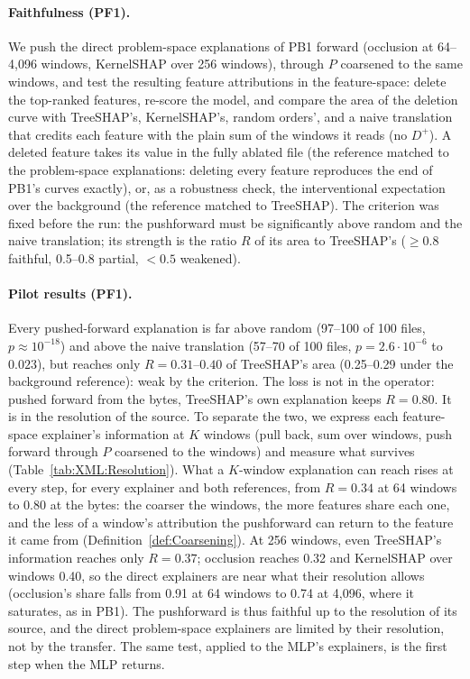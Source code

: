 \paragraph{Faithfulness (PF1).} We push the direct problem-space explanations of PB1 forward (occlusion at 64--4{,}096 windows, KernelSHAP over 256 windows), through $P$ coarsened to the same windows, and test the resulting feature attributions in the feature-space: delete the top-ranked features, re-score the model, and compare the area of the deletion curve with TreeSHAP's, KernelSHAP's, random orders', and a naive translation that credits each feature with the plain sum of the windows it reads (no $D^{+}$). A deleted feature takes its value in the fully ablated file (the reference matched to the problem-space explanations: deleting every feature reproduces the end of PB1's curves exactly), or, as a robustness check, the interventional expectation over the background (the reference matched to TreeSHAP). The criterion was fixed before the run: the pushforward must be significantly above random and the naive translation; its strength is the ratio $R$ of its area to TreeSHAP's ($\geq 0.8$ faithful, 0.5--0.8 partial, $< 0.5$ weakened).

\paragraph{Pilot results (PF1).} Every pushed-forward explanation is far above random (97--100 of 100 files, $p \approx 10^{-18}$) and above the naive translation (57--70 of 100 files, $p = 2.6 \cdot 10^{-6}$ to $0.023$), but reaches only $R = 0.31$--$0.40$ of TreeSHAP's area (0.25--0.29 under the background reference): weak by the criterion. The loss is not in the operator: pushed forward from the bytes, TreeSHAP's own explanation keeps $R = 0.80$. It is in the resolution of the source. To separate the two, we express each feature-space explainer's information at $K$ windows (pull back, sum over windows, push forward through $P$ coarsened to the windows) and measure what survives (Table~\ref{tab:XML:Resolution}). What a $K$-window explanation can reach rises at every step, for every explainer and both references, from $R = 0.34$ at 64 windows to $0.80$ at the bytes: the coarser the windows, the more features share each one, and the less of a window's attribution the pushforward can return to the feature it came from (Definition~\ref{def:Coarsening}). At 256 windows, even TreeSHAP's information reaches only $R = 0.37$; occlusion reaches 0.32 and KernelSHAP over windows 0.40, so the direct explainers are near what their resolution allows (occlusion's share falls from 0.91 at 64 windows to 0.74 at 4{,}096, where it saturates, as in PB1). The pushforward is thus faithful up to the resolution of its source, and the direct problem-space explainers are limited by their resolution, not by the transfer. The same test, applied to the MLP's explainers, is the first step when the MLP returns.

